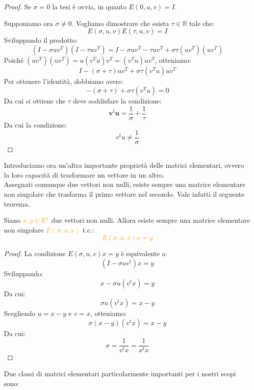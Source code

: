 \begin{proof}

    Se $\sigma = 0$ la tesi è ovvia, in quanto $E(0, u, v) = I$.
    
    Supponiamo ora $\sigma \neq 0$. Vogliamo dimostrare che esista $\tau \in \mathbb{R}$ tale che:
    \[
    E(\sigma, u, v) E(\tau, u, v) = I
    \]
    Sviluppando il prodotto:
    \[
    (I - \sigma uv^T)(I - \tau uv^T) = I - \sigma uv^T - \tau uv^T + \sigma \tau (uv^T)(uv^T)
    \]
    Poiché $(uv^T)(uv^T) = u(v^T u)v^T = (v^T u)uv^T$, otteniamo:
    \[
    I - (\sigma + \tau) uv^T + \sigma \tau (v^T u) uv^T
    \]
    Per ottenere l'identità, dobbiamo avere:
    \[
    -(\sigma + \tau) + \sigma \tau (v^T u) = 0
    \]
    Da cui si ottiene che $\tau$ deve soddisfare la condizione:
    \begin{equation}\label{eq.:cond_inv_elementare}
        \textbf{v}^t \textbf{u} = \frac{1}{\sigma} + \frac{1}{\tau}
    \end{equation}
    Da cui la condizione:
    \[v^t u \neq \frac{1}{\sigma}\]
\end{proof}

Introduciamo ora un'altra importante proprietà delle matrici elementari,
ovvero la loro capacità di trasformare un vettore in un altro.\\
Assegnati comunque due vettori non nulli, esiste sempre una matrice
elementare non singolare che trasforma il primo vettore nel secondo. Vale
infatti il seguente teorema.

\begin{theorem}
    Siano \textcolor{orange}{$x, y \in \mathbb{R}^n$} due vettori non nulli.
     Allora esiste sempre una matrice elementare non singolare \textcolor{orange}{$E(\sigma, u, v)$} t.c.:
    \textcolor{orange}{\[E(\sigma, u, v)x = y\]}
\end{theorem}

\begin{proof}
    La condizione $E(\sigma, u, v)x = y$ è equivalente a:
    \[(I - \sigma uv^t)x = y\]
Sviluppando:
\[x - \sigma u(v^t x) = y\]
Da cui:
\[\sigma u(v^t x) = x - y\]
Scegliendo $u = x - y$ e $v = x$, otteniamo:
\[\sigma (x - y)(v^t x) = x - y\]
Da cui:
\[\sigma = \frac{1}{v^t x} = \frac{1}{x^t x}\]
\end{proof}

Due classi di matrici elementari particolarmente importanti per i nostri scopi sono:

